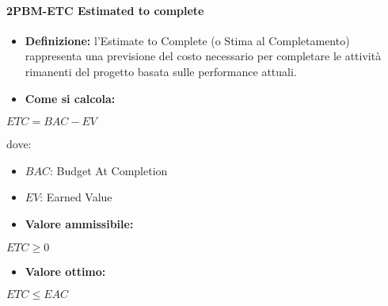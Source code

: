 \paragraph*{2PBM-ETC Estimated to complete}
\begin{itemize}
    \item \textbf{Definizione:} l’Estimate to Complete (o Stima al Completamento) rappresenta una previsione del costo necessario per completare le attività rimanenti del progetto basata sulle performance attuali.
    \item \textbf{Come si calcola:}
\end{itemize}
\begin{center}
   $ETC = BAC - EV$ 
\end{center}
dove:
\begin{itemize}[label=$\rightarrow$]
    \item $BAC$: Budget At Completion
    \item $EV$: Earned Value
\end{itemize}
\begin{itemize}
    \item \textbf{Valore ammissibile:}
\end{itemize}
\begin{center}
    $ETC \geq 0$
\end{center}
\begin{itemize}
    \item \textbf{Valore ottimo:}
\end{itemize}
\begin{center}
    $ETC \leq EAC$
\end{center}

